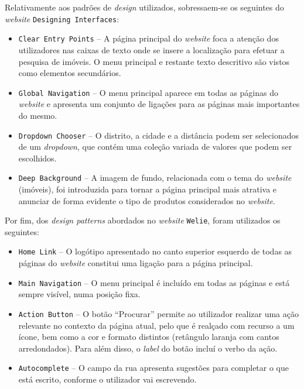 Relativamente aos padrões de \textit{design} utilizados, sobressaem-se os seguintes do \textit{website} \texttt{Designing Interfaces}:

\begin{itemize}
    \item \texttt{Clear Entry Points} -- A página principal do \textit{website} foca a atenção dos utilizadores nas caixas de texto onde se insere a localização para efetuar a pesquisa de imóveis. O menu principal e restante texto descritivo são vistos como elementos secundários.
    
    \item \texttt{Global Navigation} -- O menu principal aparece em todas as páginas do \textit{website} e apresenta um conjunto de ligações para as páginas mais importantes do mesmo.

    \item \texttt{Dropdown Chooser} -- O distrito, a cidade e a distância podem ser selecionados de um \textit{dropdown}, que contém uma coleção variada de valores que podem ser escolhidos.
    
    \item \texttt{Deep Background} -- A imagem de fundo, relacionada com o tema do \textit{website} (imóveis), foi introduzida para tornar a página principal mais atrativa e anunciar de forma evidente o tipo de produtos considerados no \textit{website}.
\end{itemize}

Por fim, dos \textit{design patterns} abordados no \textit{website} \texttt{Welie}, foram utilizados os seguintes:

\begin{itemize}
    \item \texttt{Home Link} -- O logótipo apresentado no canto superior esquerdo de todas as páginas do \textit{website} constitui uma ligação para a página principal.
    
    \item \texttt{Main Navigation} -- O menu principal é incluído em todas as páginas e está sempre visível, numa posição fixa.
    
    \item \texttt{Action Button} -- O botão ``Procurar'' permite ao utilizador realizar uma ação relevante no contexto da página atual, pelo que é realçado com recurso a um ícone, bem como a cor e formato distintos (retângulo laranja com cantos arredondados). Para além disso, o \textit{label} do botão incluí o verbo da ação.
    
    \item \texttt{Autocomplete} -- O campo da rua apresenta sugestões para completar o que está escrito, conforme o utilizador vai escrevendo.
\end{itemize}


